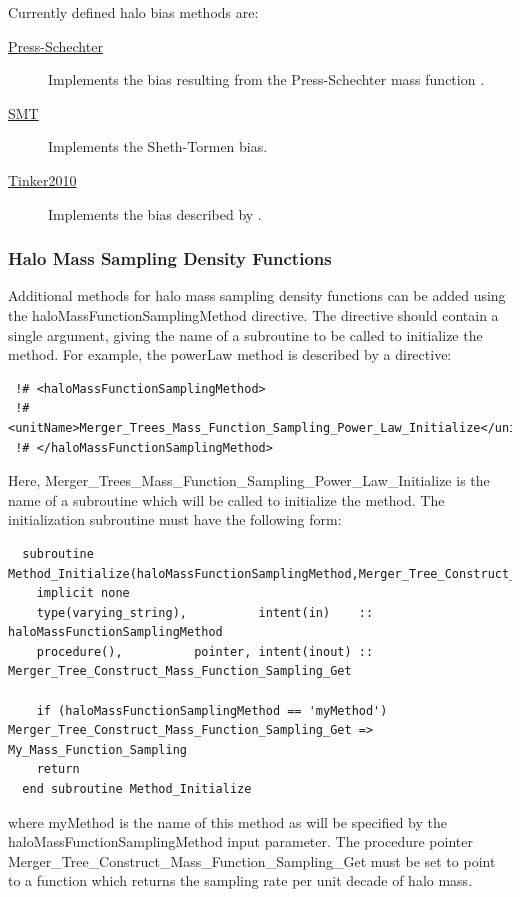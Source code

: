 Currently defined halo bias methods are:
\begin{description}
 \item [\hyperlink{structure_formation.halo_bias.Press-Schechter.F90:dark_matter_halo_biases_press_schechter:dark_matter_halo_bias_press_schechter}{{\normalfont \ttfamily Press-Schechter}}] Implements the bias resulting from the Press-Schechter \citep{press_formation_1974} mass function \citep{mo_analytic_1996}.
 \item [\hyperlink{structure_formation.halo_bias.SMT.F90:dark_matter_halo_biases_smt:dark_matter_halo_bias_smt}{{\normalfont \ttfamily SMT}}] Implements the Sheth-Tormen \citep{sheth_ellipsoidal_2001} bias.
 \item [\hyperlink{structure_formation.halo_bias.Tinker2010.F90:dark_matter_halo_biases_tinker2010:dark_matter_halo_bias_tinker2010}{{\normalfont \ttfamily Tinker2010}}] Implements the bias described by \cite{tinker_large_2010}.
\end{description}

\subsubsection{Halo Mass Sampling Density Functions}

Additional methods for halo mass sampling density functions can be added using the {\normalfont \ttfamily haloMassFunctionSamplingMethod} directive. The directive should contain a single argument, giving the name of a subroutine to be called to initialize the method. For example, the {\normalfont \ttfamily powerLaw} method is described by a directive:
\begin{verbatim}
 !# <haloMassFunctionSamplingMethod>
 !#  <unitName>Merger_Trees_Mass_Function_Sampling_Power_Law_Initialize</unitName>
 !# </haloMassFunctionSamplingMethod>
\end{verbatim}
Here, {\normalfont \ttfamily Merger\_Trees\_Mass\_Function\_Sampling\_Power\_Law\_Initialize} is the name of a subroutine which will be called to initialize the method. The initialization subroutine must have the following form:
\begin{verbatim}
  subroutine Method_Initialize(haloMassFunctionSamplingMethod,Merger_Tree_Construct_Mass_Function_Sampling_Get)
    implicit none
    type(varying_string),          intent(in)    :: haloMassFunctionSamplingMethod
    procedure(),          pointer, intent(inout) :: Merger_Tree_Construct_Mass_Function_Sampling_Get
    
    if (haloMassFunctionSamplingMethod == 'myMethod') Merger_Tree_Construct_Mass_Function_Sampling_Get => My_Mass_Function_Sampling
    return
  end subroutine Method_Initialize
\end{verbatim}
where {\normalfont \ttfamily myMethod} is the name of this method as will be specified by the {\normalfont \ttfamily haloMassFunctionSamplingMethod} input parameter. The procedure pointer {\normalfont \ttfamily Merger\_Tree\_Construct\_Mass\_Function\_Sampling\_Get} must be set to point to a function which returns the sampling rate per unit decade of halo mass.

